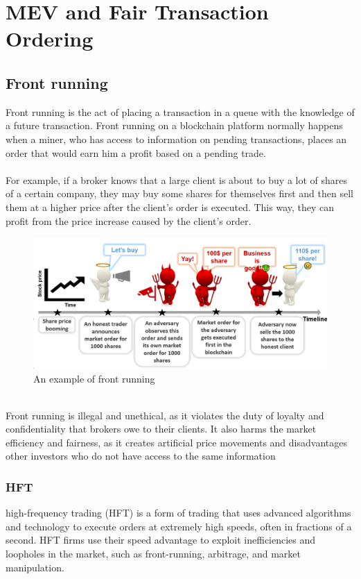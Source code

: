 \chapter{MEV and Fair Transaction Ordering}

\section{Front running}
Front running is the act of placing a transaction in a queue with the knowledge of a future transaction. Front running on a blockchain platform normally happens when a miner, who has access to information on pending transactions, places an order that would earn him a profit based on a pending trade.\\\\
For example, if a broker knows that a large client is about to buy a lot of shares of a certain company, they may buy some shares for themselves first and then sell them at a higher price after the client’s order is executed. This way, they can profit from the price increase caused by the client’s order.
\begin{figure}[h!]
	\centering
	\includegraphics[width=0.7\linewidth]{Fig/L21_F1}
	\caption{An example of front running}
	\label{fig:L21_f1}
\end{figure}\\	
Front running is illegal and unethical, as it violates the duty of loyalty and confidentiality that brokers owe to their clients. It also harms the market efficiency and fairness, as it creates artificial price movements and disadvantages other investors who do not have access to the same information

\subsection{HFT}
high-frequency trading (HFT) is a form of trading that uses advanced algorithms and technology to execute orders at extremely high speeds, often in fractions of a second. HFT firms use their speed advantage to exploit inefficiencies and loopholes in the market, such as front-running, arbitrage, and market manipulation. 

